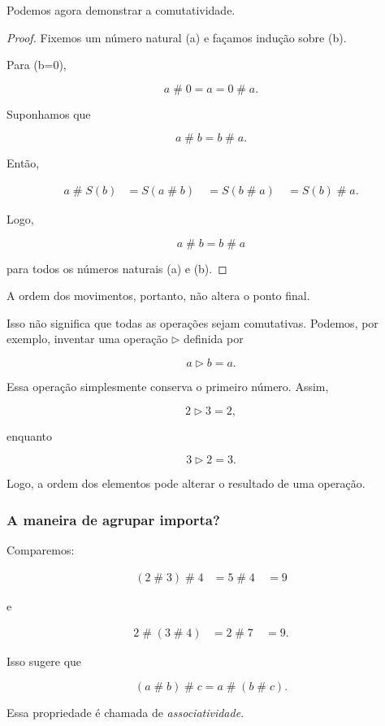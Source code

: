 \documentclass[12pt,a4paper]{article}
\newcommand{\mov}{\mathbin{\#}}
\begin{document}
Podemos agora demonstrar a comutatividade.

\begin{proof}
Fixemos um número natural (a) e façamos indução sobre (b).

Para (b=0),

\[
a\mov0=a=0\mov a.
\]

Suponhamos que

\[
a\mov b=b\mov a.
\]

Então,

\[
\begin{aligned}
a\mov S(b)
&=S(a\mov b)\
&=S(b\mov a)\
&=S(b)\mov a.
\end{aligned}
\]

Logo,

\[
a\mov b=b\mov a
\]

para todos os números naturais (a) e (b).
\end{proof}

A ordem dos movimentos, portanto, não altera o ponto final.

Isso não significa que todas as operações sejam comutativas. Podemos,
por exemplo, inventar uma operação $\triangleright$ definida por

\[
a\triangleright b=a.
\]

Essa operação simplesmente conserva o primeiro número. Assim,

\[
2\triangleright3=2,
\]

enquanto

\[
3\triangleright2=3.
\]

Logo, a ordem dos elementos pode alterar o resultado de uma operação.

\subsubsection{A maneira de agrupar importa?}

Comparemos:

\[
\begin{aligned}
(2\mov3)\mov4
&=5\mov4\
&=9
\end{aligned}
\]

e

\[
\begin{aligned}
2\mov(3\mov4)
&=2\mov7\
&=9.
\end{aligned}
\]

Isso sugere que

\[
(a\mov b)\mov c=a\mov(b\mov c).
\]

Essa propriedade é chamada de \emph{associatividade}.
\end{document}

